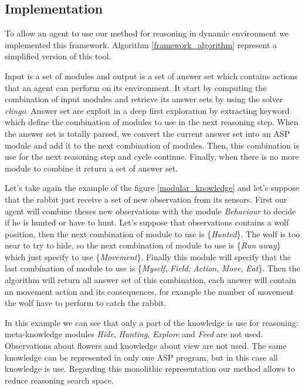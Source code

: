 \documentclass{aamas2012}
\begin{document}
\subsection{Implementation}

	To allow an agent to use our method for reasoning in dynamic environment we implemented this framework.
	Algorithm \ref{framework_algorithm} represent a simplified version of this tool.
	
	Input is a set of modules and output is a set of answer set which contains actions that an agent can perform on its environment.
	It start by computing the combination of input modules and retrieve its answer sets by using the solver \emph{clingo}.
	Answer set are exploit in a deep first exploration by extracting keyword which define the combination of modules to use in the next reasoning step.
	When the answer set is totally parsed, we convert the current answer set into an ASP module and add it to the next combination of modules.
	Then, this combination is use for the next reasoning step and cycle continue.
	Finally, when there is no more module to combine it return a set of answer set.

	Let's take again the example of the figure \ref{modular_knowledge} and let's suppose that the rabbit just receive a set of new observation from its sensors.
	First our agent will combine theses new observations with the module \emph{Behaviour} to decide if he is hunted or have to hunt.
	Let's suppose that observations contains a wolf position, then the next combination of module to use is \{\emph{Hunted}\}.
	The wolf is too near to try to hide, so the next combination of module to use is \{\emph{Run away}\} which just specify to use \{\emph{Movement}\}.
	Finally this module will specify that the last combination of module to use is \{\emph{Myself}, \emph{Field}, \emph{Action}, \emph{Move}, \emph{Eat}\}.
	Then the algorithm will return all answer set of this combination, each answer will contain an movement action and its consequences, 
	for example the number of movement the wolf have to perform to catch the rabbit.
	
	In this example we can see that only a part of the knowledge is use for reasoning: 
	meta-knowledge modules \emph{Hide}, \emph{Hunting}, \emph{Explore} and \emph{Feed} are not used.
	Observations about flowers and knowledge about view are not used.
	The same knowledge can be represented in only one ASP program, but in this case all knowledge is use.
	Regarding this monolithic representation our method allows to reduce reasoning search space.
	
\end{document}

